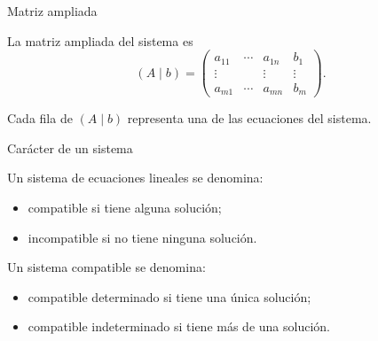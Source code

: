 \begin{frame}{Matriz ampliada}

La \alert{matriz ampliada} del sistema es
\[
(A\mid b)=
\left(
\begin{array}{ccc|c}
a_{11}&\cdots&a_{1n}&b_1\\
\vdots&&\vdots&\vdots\\
a_{m1}&\cdots&a_{mn}&b_m
\end{array}
\right).
\]


Cada fila de \((A\mid b)\) representa una de las ecuaciones del sistema.

\end{frame}

\begin{frame}{Carácter de un sistema}

\begin{definition}
Un sistema de ecuaciones lineales se denomina:
\begin{itemize}
    \item \alert{compatible} si tiene alguna solución;
    \item \alert{incompatible} si no tiene ninguna solución.
\end{itemize}

Un sistema compatible se denomina:
\begin{itemize}
    \item \alert{compatible determinado} si tiene una única solución;
    \item \alert{compatible indeterminado} si tiene más de una solución.
\end{itemize}
\end{definition}

\end{frame}

